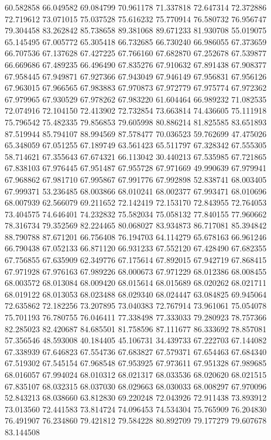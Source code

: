 60.582858
66.049582
69.084799
70.961178
71.337818
72.647314
72.372886
72.719612
73.071015
75.037528
75.616232
75.770914
76.580732
76.956747
79.304458
83.262842
85.738658
89.381068
89.671233
81.930708
55.019075
65.145495
67.005772
65.305418
66.732685
66.730240
66.986055
67.373659
66.707536
67.137628
67.427225
67.766160
67.682870
67.252678
67.539877
66.669686
67.489235
66.496490
67.835276
67.910632
67.891438
67.908377
67.958445
67.949871
67.927366
67.943049
67.946149
67.956831
67.956126
67.963015
67.966565
67.983883
67.970873
67.972779
67.975774
67.972362
67.979965
67.930529
67.978262
67.983220
61.604464
66.989232
71.082535
72.074916
72.104150
72.413902
72.732854
73.663814
74.436605
75.111918
75.796542
75.482335
79.856853
79.605998
80.886214
81.825585
83.651893
87.519944
85.794107
88.994569
87.578477
70.036523
59.762699
47.475026
65.348059
67.051255
67.189749
63.561423
65.511797
67.328342
67.555305
58.714621
67.355643
67.674321
66.113042
30.440213
67.535985
67.721865
67.838103
67.976445
67.951487
67.955728
67.971669
49.990639
67.979941
67.968862
67.981710
67.995867
67.991776
67.992898
52.838741
68.003405
67.999371
53.236485
68.003866
68.010241
68.002377
67.993471
68.010696
68.007939
62.566079
69.211652
72.142419
72.153170
72.843955
72.764053
73.404575
74.646401
74.232832
75.582034
75.058132
77.840155
77.960662
78.316734
79.352569
82.224465
80.068027
83.934873
86.717081
85.394842
88.790788
87.671201
66.756408
76.194703
64.114279
65.678163
66.961246
66.790438
67.052133
66.871120
66.931233
67.552120
67.428490
67.682355
67.756855
67.635909
62.349776
67.175614
67.892015
67.942719
67.868415
67.971928
67.976163
67.989226
68.000673
67.971229
68.012386
68.008455
68.003572
68.013084
68.009420
68.015614
68.015689
68.020262
68.021711
68.019122
68.013053
68.023488
68.029340
68.024447
63.084825
69.945064
72.635862
72.182256
73.207895
73.040383
72.767914
73.961061
75.054078
75.701193
76.780755
76.046411
77.338498
77.333033
79.280923
78.757366
82.285023
82.420687
84.685501
81.758596
87.111677
86.333692
78.857081
57.356546
48.593008
40.184405
45.106731
34.439733
67.222703
67.144082
67.338939
67.646823
67.554736
67.683827
67.579371
67.654463
67.684340
67.519302
67.545154
67.968548
67.953925
67.973611
67.951328
67.989685
68.016057
67.994024
68.010312
68.021317
68.033536
68.020620
68.021515
67.835107
68.032315
68.037030
68.029663
68.030033
68.008297
67.970096
52.843213
68.038660
63.812830
69.220248
72.043926
72.911438
73.893912
73.013560
72.441583
73.814724
74.096453
74.534304
75.765909
76.204830
76.491907
76.234860
79.421812
79.584228
80.892709
79.177279
79.607678
83.144508
